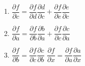 \begin{enumerate}
\begin{multicols}{3}
\begin{enumerate}[leftmargin=0.1cm, label={}]
        \item[] $
            \dfrac{\partial f}{\partial c}
            = \dfrac{\partial f}{\partial d} \dfrac{\partial d}{\partial c}
            + \dfrac{\partial f}{\partial e} \dfrac{\partial e}{\partial c}
        $
        \item[] $
            \dfrac{\partial f}{\partial a}
            = \dfrac{\partial f}{\partial b} \dfrac{\partial b}{\partial a}
            + \dfrac{\partial f}{\partial c} \dfrac{\partial c}{\partial a}
        $
        \item[] 
        $
            \dfrac{\partial f}{\partial b}
            = \dfrac{\partial f}{\partial c} \dfrac{\partial c}{\partial b}
        $
            \hspace{0.2cm}
            \vline
            \hspace{0.2cm}
        $
            \dfrac{\partial f}{\partial x}
            = \dfrac{\partial f}{\partial a} \dfrac{\partial a}{\partial x}
        $
    \end{enumerate}
    \end{multicols}
\end{enumerate}

























